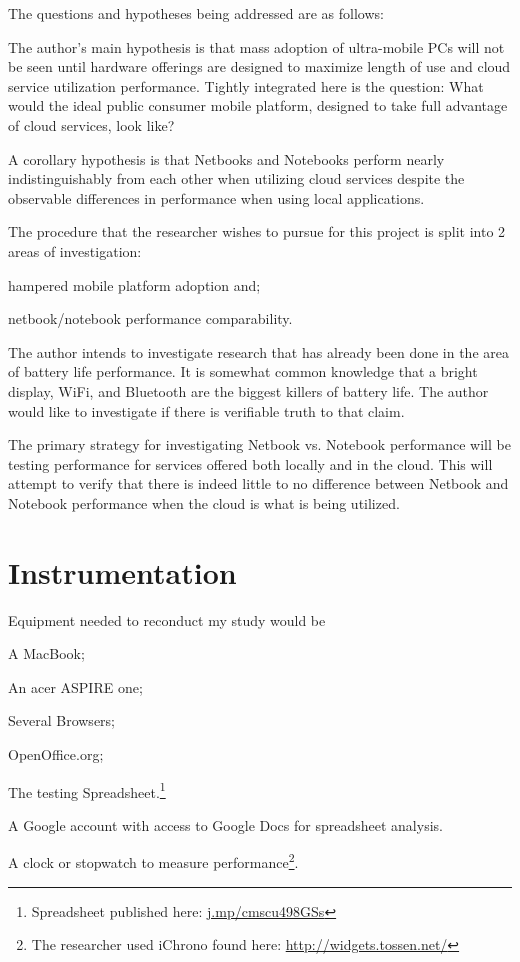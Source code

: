 The questions and hypotheses being addressed are as follows:
\begin{inparaenum}[(1)]
  \item The author's main hypothesis is that mass adoption of ultra-mobile PCs
    will not be seen until hardware offerings are designed to maximize length of
    use and cloud service utilization performance.  Tightly integrated here is
    the question: What would the ideal public consumer mobile platform, designed
    to take full advantage of cloud services, look like?
  \item A corollary hypothesis is that Netbooks and Notebooks perform nearly
    indistinguishably from each other when utilizing cloud services despite the
    observable differences in performance when using local applications.
\end{inparaenum}

The procedure that the researcher wishes to pursue for this project is split
into 2 areas of investigation:
\begin{inparaenum}[(1)]
\item hampered mobile platform adoption and;
\item netbook/notebook performance comparability.
\end{inparaenum}

The author intends to investigate research that has already been done in the
area of battery life performance.  It is somewhat common knowledge that a bright
display, WiFi, and Bluetooth are the biggest killers of battery life.  The
author would like to investigate if there is verifiable truth to that claim.

The primary strategy for investigating Netbook vs. Notebook performance will be
testing performance for services offered both locally and in the cloud.  This
will attempt to verify that there is indeed little to no difference between
Netbook and Notebook performance when the cloud is what is being utilized.

\section{Instrumentation}


Equipment needed to reconduct my study would be
\begin{inparaenum}[(1)]
\item A MacBook;
\item An acer ASPIRE one;
\item Several Browsers;
\item OpenOffice.org;
\item The testing Spreadsheet.\footnote{Spreadsheet published here:
  \url{j.mp/cmscu498GSs}}
\item A Google account with access to Google Docs for spreadsheet analysis.
\item A clock or stopwatch to measure performance\footnote{The researcher used
  iChrono found here: \url{http://widgets.tossen.net/}}.
\end{inparaenum}

